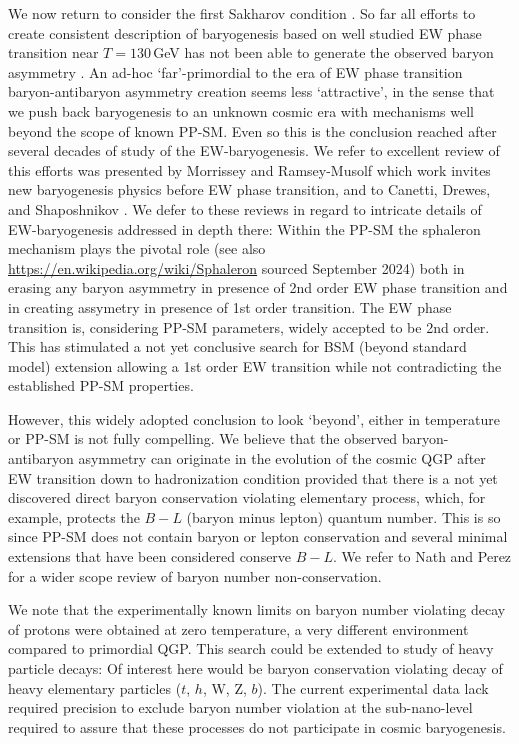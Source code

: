{\color{blue} We now return to consider the first Sakharov condition .  So far all efforts to create consistent description of baryogenesis based on well studied EW phase transition near $T=130$\,GeV has not been able to generate the observed baryon asymmetry \cite{Kuzmin:1985mm,Kuzmin:1987wn,Arnold:1987mh,Kolb:1996jt,Riotto:1999yt,Nielsen:2001fy,Giudice:2003jh,Davidson:2008bu,Morrissey:2012db,Canetti:2012zc}. An ad-hoc `far'-primordial to the era of EW  phase transition baryon-antibaryon asymmetry creation seems less `attractive', in the sense that we push back baryogenesis to an unknown cosmic era with mechanisms well beyond the scope of known PP-SM. Even so this is the conclusion reached after several decades of study of the EW-baryogenesis. We refer to excellent review of this efforts was presented by Morrissey and Ramsey-Musolf \cite{Morrissey:2012db} which work invites new baryogenesis physics before EW phase transition, and to Canetti, Drewes,  and Shaposhnikov \cite{Canetti:2012zc}. We defer to these reviews in regard to intricate details of EW-baryogenesis  addressed in depth there: Within the PP-SM the sphaleron mechanism plays the pivotal role (see also \url{https://en.wikipedia.org/wiki/Sphaleron} sourced September 2024) both in erasing any baryon asymmetry in presence of 2nd order EW phase transition and in creating assymetry in presence of 1st order transition. The EW phase transition is, considering PP-SM parameters, widely accepted to be 2nd order. This has stimulated a not yet conclusive search for BSM (beyond standard model) extension allowing a 1st order EW transition while not contradicting the established PP-SM properties.}

{\color{blue}However, this  widely adopted conclusion to look `beyond', either in temperature or PP-SM is not fully compelling. We believe that the observed baryon-antibaryon  asymmetry can originate in the evolution of the cosmic QGP after EW transition down to hadronization condition provided that there is a  not yet discovered direct baryon conservation violating elementary process, which, for example, protects the $B-L$ (baryon minus lepton) quantum number. This is so since PP-SM does not contain baryon or lepton conservation and several minimal extensions that have been considered conserve $B-L$.  We refer to Nath and Perez \cite{Nath:2006ut} for a wider scope review of baryon number non-conservation. }

{\color{blue}We note that the experimentally known limits on baryon number violating decay of protons were obtained at zero temperature, a very different environment compared to primordial QGP. This search could be extended to study of heavy particle decays: Of interest here would be baryon conservation violating decay of heavy elementary particles ($t$, $h$, W, Z, $b$). The current experimental data lack required precision to exclude  baryon number violation at the sub-nano-level required to assure that these processes do not participate in cosmic baryogenesis.} 
 
